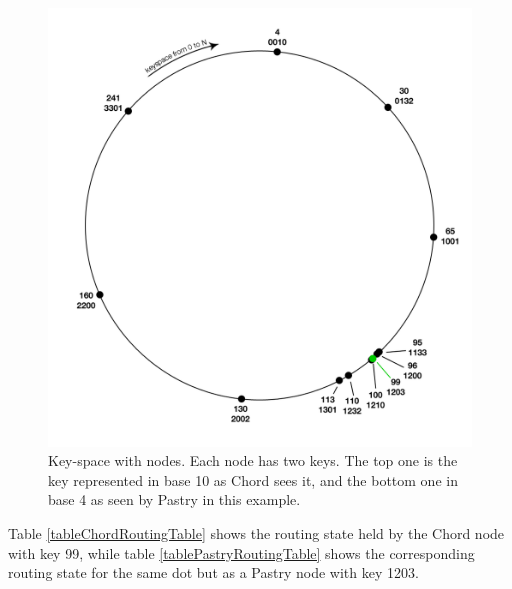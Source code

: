 \begin{figure}[!htb]
\begin{center}
	\includegraphics[width=0.9\linewidth]{illustrations/KeyspaceExample.png}
  \caption{Key-space with nodes. Each node has two keys. The top one is the key represented in base 10 as Chord sees it, and the bottom one in base 4 as seen by Pastry in this example.}
  \label{figKeyspaceExample}
\end{center}
\end{figure}

Table \ref{tableChordRoutingTable} shows the routing state held by the Chord node with key 99, while table \ref{tablePastryRoutingTable} shows the corresponding routing state for the same dot but as a Pastry node with key 1203.

